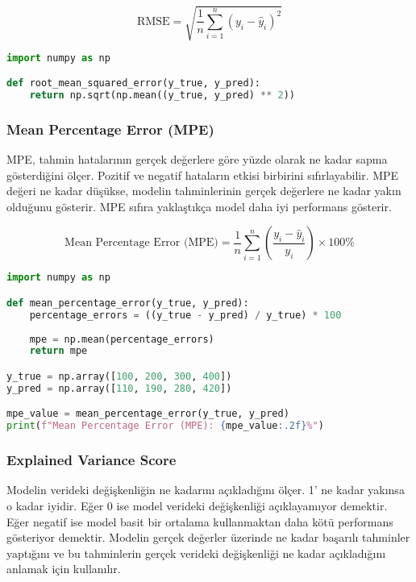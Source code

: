 \[\text{RMSE} = \sqrt{\frac{1}{n} \sum_{i=1}^{n} (y_i - \hat{y}_i)^2}\]

\begin{lstlisting}[language=Python]
import numpy as np

def root_mean_squared_error(y_true, y_pred):
    return np.sqrt(np.mean((y_true, y_pred) ** 2))
\end{lstlisting}

\newpage

\subsubsection{Mean Percentage Error (MPE)} 

MPE, tahmin hatalarının gerçek değerlere göre yüzde olarak ne kadar sapma gösterdiğini ölçer. Pozitif ve negatif hataların etkisi birbirini sıfırlayabilir. MPE değeri ne kadar düşükse, modelin tahminlerinin gerçek değerlere ne kadar yakın olduğunu gösterir. MPE sıfıra yaklaştıkça model daha iyi performans gösterir.

\[\text{Mean Percentage Error (MPE)} = \frac{1}{n} \sum_{i=1}^{n} \left( \frac{y_i - \hat{y}_i}{y_i} \right) \times 100\%\]

\begin{lstlisting}[language=Python]
import numpy as np

def mean_percentage_error(y_true, y_pred):
    percentage_errors = ((y_true - y_pred) / y_true) * 100
    
    mpe = np.mean(percentage_errors)
    return mpe

y_true = np.array([100, 200, 300, 400])
y_pred = np.array([110, 190, 280, 420])

mpe_value = mean_percentage_error(y_true, y_pred)
print(f"Mean Percentage Error (MPE): {mpe_value:.2f}%")
\end{lstlisting}

\newpage

\subsubsection{Explained Variance Score}

Modelin verideki değişkenliğin ne kadarını açıkladığını ölçer. 1' ne kadar yakınsa o kadar iyidir. Eğer 0 ise model verideki değişkenliği açıklayamıyor demektir. Eğer negatif ise model basit bir ortalama kullanmaktan daha kötü performans gösteriyor demektir. Modelin gerçek değerler üzerinde ne kadar başarılı tahminler yaptığını ve bu tahminlerin gerçek verideki değişkenliği ne kadar açıkladığını anlamak için kullanılır.

